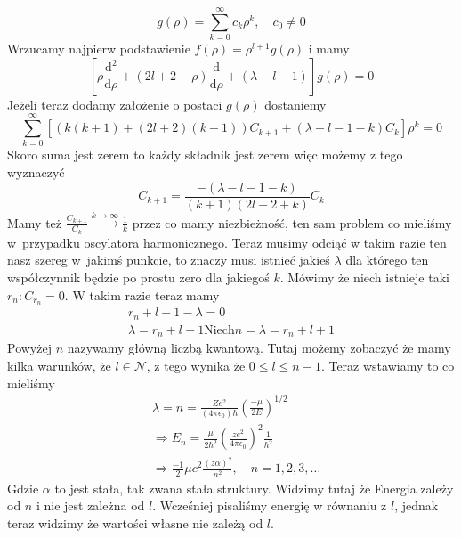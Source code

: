 \begin{equation*}
	g(\rho)=\sum_{k=0}^{\infty} c_{k} \rho^{k}, \quad c_0 \neq 0
\end{equation*}
Wrzucamy najpierw podstawienie $f(\rho) = \rho^{l+1}g(\rho)$ i mamy
\begin{equation*}
	\left[\rho\frac{\text{d}^{2}}{\text{d} \rho}+(2l + 2 - \rho)\frac{\text{d}}{\text{d} \rho} + (\lambda - l - 1)\right] g(\rho)=0
\end{equation*}
Jeżeli teraz dodamy założenie o postaci $g(\rho)$ dostaniemy
\begin{equation*}
	\sum_{k=0}^{\infty}\left[ \left( k(k+1) + (2l+2)(k+1) \right)C_{k+1} + (\lambda - l - 1 -k)C_k \right]\rho^k=0
\end{equation*}
Skoro suma jest zerem to każdy składnik jest zerem więc możemy z tego wyznaczyć
\begin{equation*}
	C_{k+1} = \frac{-(\lambda - l - 1 -k)}{(k+1)(2l+2+k)} C_k
\end{equation*}
Mamy też $\frac{C_{k+1}}{C_k} \xrightarrow{k \to \infty} \frac{1}{k}$ przez co mamy niezbieżność, ten sam problem co mieliśmy w~przypadku oscylatora harmonicznego. Teraz musimy odciąć w takim razie ten nasz szereg w~jakimś punkcie, to znaczy musi istnieć jakieś $\lambda$ dla którego ten współczynnik będzie po prostu zero dla jakiegoś $k$. Mówimy że niech istnieje taki $r_n:C_{r_n}= 0$. W takim razie teraz mamy
\begin{equation*}
	\begin{gathered}
		r_n+ l +1 - \lambda = 0 \\
		\lambda = r_n + l +1
		\text{Niech} n = \lambda = r_n + l +1
	\end{gathered}
\end{equation*}
Powyżej $n$ nazywamy główną liczbą kwantową. Tutaj możemy zobaczyć że mamy kilka warunków, że $l \in \mathcal{N}$, z tego wynika że $0 \leq l \leq n - 1$. Teraz wstawiamy to co mieliśmy 
\begin{equation*}
	\begin{split}
		&\lambda = n = \frac{Z e^2}{(4 \pi \epsilon_0) \hbar} \left(\frac{-\mu}{2E}\right)^{1/2} \\
		&\Rightarrow E_n = \frac{\mu}{2\hbar^2} \left( \frac{ze^2}{4 \pi \epsilon_0} \right)^2 \frac{1}{\hbar^2} \\
		&\Rightarrow \frac{-1}{2}\mu c^2 \frac{(z\alpha)^2}{n^2}, \quad n = 1, 2, 3, \dotsc
	\end{split}
\end{equation*}
Gdzie $\alpha$ to jest stała, tak zwana stała struktury. Widzimy tutaj że Energia zależy od $n$ i nie jest zależna od $l$. Wcześniej pisaliśmy energię w równaniu z $l$, jednak teraz widzimy że wartości własne nie zależą od $l$.

